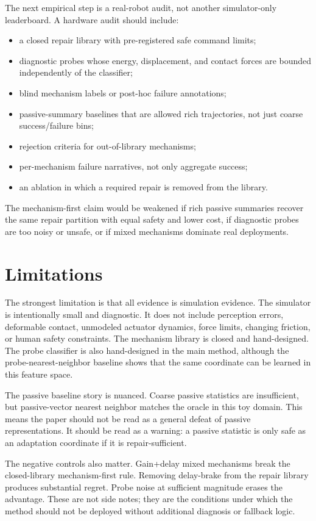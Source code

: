 \documentclass{article}
\begin{document}
The next empirical step is a real-robot audit, not another simulator-only
leaderboard. A hardware audit should include:
\begin{itemize}
    \item a closed repair library with pre-registered safe command limits;
    \item diagnostic probes whose energy, displacement, and contact forces are
    bounded independently of the classifier;
    \item blind mechanism labels or post-hoc failure annotations;
    \item passive-summary baselines that are allowed rich trajectories, not just
    coarse success/failure bins;
    \item rejection criteria for out-of-library mechanisms;
    \item per-mechanism failure narratives, not only aggregate success;
    \item an ablation in which a required repair is removed from the library.
\end{itemize}
The mechanism-first claim would be weakened if rich passive summaries recover
the same repair partition with equal safety and lower cost, if diagnostic probes
are too noisy or unsafe, or if mixed mechanisms dominate real deployments.

\section{Limitations}

The strongest limitation is that all evidence is simulation evidence. The
simulator is intentionally small and diagnostic. It does not include perception
errors, deformable contact, unmodeled actuator dynamics, force limits, changing
friction, or human safety constraints. The mechanism library is closed and
hand-designed. The probe classifier is also hand-designed in the main method,
although the probe-nearest-neighbor baseline shows that the same coordinate can
be learned in this feature space.

The passive baseline story is nuanced. Coarse passive statistics are
insufficient, but passive-vector nearest neighbor matches the oracle in this
toy domain. This means the paper should not be read as a general defeat of
passive representations. It should be read as a warning: a passive statistic is
only safe as an adaptation coordinate if it is repair-sufficient.

The negative controls also matter. Gain+delay mixed mechanisms break the
closed-library mechanism-first rule. Removing delay-brake from the repair
library produces substantial regret. Probe noise at sufficient magnitude erases
the advantage. These are not side notes; they are the conditions under which the
method should not be deployed without additional diagnosis or fallback logic.
\end{document}
